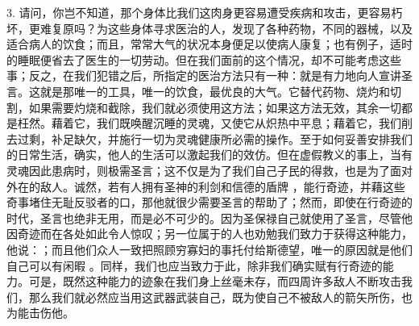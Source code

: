3. 请问，你岂不知道，那个身体比我们这肉身更容易遭受疾病和攻击，更容易朽坏，更难复原吗？为这些身体寻求医治的人，发现了各种药物，不同的器械，以及适合病人的饮食；而且，常常大气的状况本身便足以使病人康复；也有例子，适时的睡眠便省去了医生的一切劳动。但在我们面前的这个情况，却不可能考虑这些事；反之，在我们犯错之后，所指定的医治方法只有一种：就是有力地向人宣讲圣言。这就是那唯一的工具，唯一的饮食，最优良的大气。它替代药物、烧灼和切割，如果需要灼烧和截除，我们就必须使用这方法；如果这方法无效，其余一切都是枉然。藉着它，我们既唤醒沉睡的灵魂，又使它从炽热中平息；藉着它，我们削去过剩，补足缺欠，并施行一切为灵魂健康所必需的操作。至于如何妥善安排我们的日常生活，确实，他人的生活可以激起我们的效仿。但在虚假教义的事上，当有灵魂因此患病时，则极需圣言；这不仅是为了我们自己子民的得救，也是为了面对外在的敌人。诚然，若有人拥有圣神的利剑和信德的盾牌 ，能行奇迹，并藉这些奇事堵住无耻反驳者的口，那他就很少需要圣言的帮助了；然而，即使在行奇迹的时代，圣言也绝非无用，而是必不可少的。因为圣保禄自己就使用了圣言，尽管他因奇迹而在各处如此令人惊叹；另一位属于的人也劝勉我们致力于获得这种能力，他说：；而且他们众人一致把照顾穷寡妇的事托付给斯德望，唯一的原因就是他们自己可以有闲暇 。同样，我们也应当致力于此，除非我们确实赋有行奇迹的能力。可是，既然这种能力的迹象在我们身上丝毫未存，而四周许多敌人不断攻击我们，那么我们就必然应当用这武器武装自己，既为使自己不被敌人的箭矢所伤，也为能击伤他。\par

